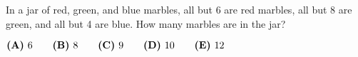 

In a jar of red, green, and blue marbles, all but 6 are red marbles, all but 8 are green, and all but 4 are blue. How many marbles are in the jar?

$\textbf{(A)}\hspace{.05in}6 \qquad \textbf{(B)}\hspace{.05in}8 \qquad \textbf{(C)}\hspace{.05in}9 \qquad \textbf{(D)}\hspace{.05in}10 \qquad \textbf{(E)}\hspace{.05in}12$
